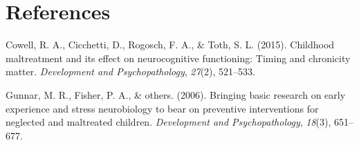 \documentclass[man]{apa6}
\begin{document}
\newpage

\section{References}\label{references}

\begingroup
\setlength{\parindent}{-0.5in} \setlength{\leftskip}{0.5in}

\hypertarget{refs}{}
\hypertarget{ref-cowell2015childhood}{}
Cowell, R. A., Cicchetti, D., Rogosch, F. A., \& Toth, S. L. (2015).
Childhood maltreatment and its effect on neurocognitive functioning:
Timing and chronicity matter. \emph{Development and Psychopathology},
\emph{27}(2), 521--533.

\hypertarget{ref-gunnar2006bringing}{}
Gunnar, M. R., Fisher, P. A., \& others. (2006). Bringing basic research
on early experience and stress neurobiology to bear on preventive
interventions for neglected and maltreated children. \emph{Development
and Psychopathology}, \emph{18}(3), 651--677.

\endgroup
\end{document}
